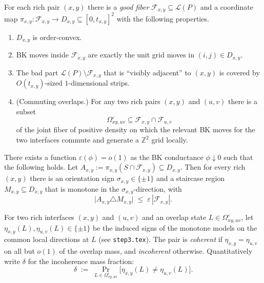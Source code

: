 \begin{theorem}
\label{thm:step1-cited}
For each rich pair $(x,y)$ there is a \emph{good fiber}
$\mathcal F_{x,y}\subseteq\mathcal L(P)$ and a coordinate map
$\pi_{x,y}\colon \mathcal F_{x,y}\to D_{x,y}\subseteq[0,t_{x,y}]^2$
with the following properties.
\begin{enumerate}[label=\textup{(S1.\arabic*)}]
\item $D_{x,y}$ is order-convex.
\item BK moves inside $\mathcal F_{x,y}$ are exactly the unit grid moves in
$(i,j)\in D_{x,y}$.
\item The bad part $\mathcal L(P)\setminus\mathcal F_{x,y}$ that is
``visibly adjacent'' to $(x,y)$ is covered by $O(t_{x,y})$-sized
$1$-dimensional strips.
\item \textup{(Commuting overlaps.)} For any two rich pairs $(x,y)$ and
$(u,v)$ there is a subset
\[
\Omega^\circ_{xy,uv}\subseteq \mathcal F_{x,y}\cap\mathcal F_{u,v}
\]
of the joint fiber of positive density on which the relevant BK moves for
the two interfaces commute and generate a $\mathbb Z^2$ grid locally.
\end{enumerate}
\end{theorem}

\begin{theorem}
\label{thm:step2-cited}
There exists a function $\varepsilon(\phi)=o(1)$ as the BK conductance
$\phi\downarrow0$ such that the following holds. Let
$A_{x,y}:=\pi_{x,y}(S\cap\mathcal F_{x,y})\subseteq D_{x,y}$. Then for
every rich $(x,y)$ there is an orientation sign
$\sigma_{x,y}\in\{\pm1\}$ and a staircase region $M_{x,y}\subseteq D_{x,y}$
that is monotone in the $\sigma_{x,y}$-direction, with
\[
\big|A_{x,y}\triangle M_{x,y}\big|
\;\le\;\varepsilon\,|\mathcal F_{x,y}|.
\]
\end{theorem}

\begin{definition}
\label{def:coherence-cited}
For two rich interfaces $(x,y)$ and $(u,v)$ and an overlap state
$L\in\Omega^\circ_{xy,uv}$, let $\eta_{x,y}(L),\eta_{u,v}(L)\in\{\pm1\}$
be the induced signs of the monotone models on the common local directions
at $L$ (see \texttt{step3.tex}). The pair is \emph{coherent} if
$\eta_{x,y}=\eta_{u,v}$ on all but $o(1)$ of the overlap mass, and
\emph{incoherent} otherwise. Quantitatively write $\delta$ for the
incoherence mass fraction:
\[
\delta
\;:=\;
\Pr_{L\in\Omega^\circ_{xy,uv}}\!\big[\eta_{x,y}(L)\ne\eta_{u,v}(L)\big].
\]
\end{definition}

